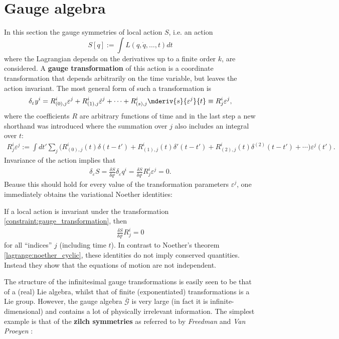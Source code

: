 \section{Gauge algebra}

    In this section the gauge symmetries of local action $S$, i.e. an action \[S[q] := \int L(q,\dot{q},\ldots,t) dt\] where the Lagrangian depends on the derivatives up to a finite order $k$, are considered. A \textbf{gauge transformation} of this action is a coordinate transformation that depends arbitrarily on the time variable, but leaves the action invariant. The most general form of such a transformation is
    \begin{gather}
        \label{constraint:gauge_transformation}
        \delta_\varepsilon y^i = R^i_{(0),j}\varepsilon^j + R^i_{(1),j}\dot{\varepsilon}^j + \cdots + R^i_{(s),j}\mderiv{s}{\varepsilon^j}{t}\equiv R^i_j\varepsilon^j,
    \end{gather}
    where the coefficients $R$ are arbitrary functions of time and in the last step a new shorthand was introduced where the summation over $j$ also includes an integral over $t$:
    \begin{gather}
        R^i_j\varepsilon^j := \int dt'\sum_j\Big(R^i_{(0),j}(t)\delta(t-t')+R^i_{(1),j}(t)\delta'(t-t')+R^i_{(2),j}(t)\delta^{(2)}(t-t')+\cdots\Big)\varepsilon^j(t').
    \end{gather}
    Invariance of the action implies that
    \begin{gather}
        \delta_\varepsilon S = \frac{\delta S}{\delta q^i}\delta_\varepsilon q^i = \frac{\delta S}{\delta q^i}R^i_j\varepsilon^j = 0.
    \end{gather}
    Beause this should hold for every value of the transformation parameters $\varepsilon^j$, one immediately obtains the variational Noether identities:
    \begin{property}
        If a local action is invariant under the transformation \eqref{constraint:gauge_transformation}, then
        \begin{gather}
            \frac{\delta S}{\delta q^i}R^i_j = 0
        \end{gather}
        for all ``indices'' $j$ (including time $t$). In contrast to Noether's theorem \ref{lagrange:noether_cyclic}, these identities do not imply conserved quantities. Instead they show that the equations of motion are not independent.
    \end{property}
    The structure of the infinitesimal gauge transformations is easily seen to be that of a (real) Lie algebra, whilst that of finite (exponentiated) transformations is a Lie group. However, the gauge algebra $\overline{\mathcal{G}}$ is very large (in fact it is infinite-dimensional) and contains a lot of physically irrelevant information. The simplest example is that of the \textbf{zilch symmetries} as referred to by \textit{Freedman} and \textit{Van Proeyen} \cite{supergravity}:
